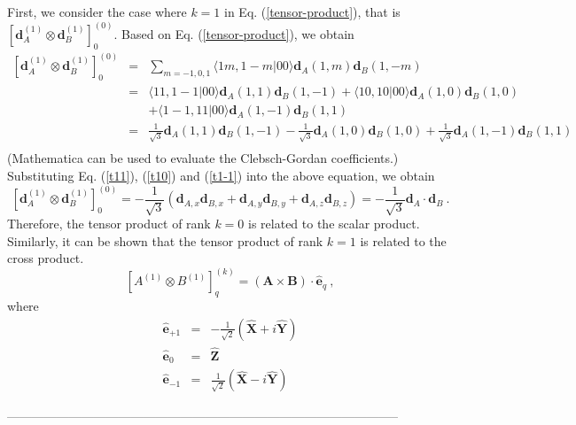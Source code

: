 First, we consider the case where $k=1$ in Eq. (\ref{tensor-product}), that is $\left[ \mathbf{d}_{A}^{(1)} \otimes \mathbf{d}_{B}^{(1)} \right]_{0}^{(0)}$. Based on Eq. (\ref{tensor-product}), we obtain
\begin{eqnarray}
\left[ \mathbf{d}_{A}^{(1)} \otimes \mathbf{d}_{B}^{(1)} \right]_{0}^{(0)} & = & \sum_{m=-1,0,1} \langle 1 m, 1 -m | 00\rangle \mathbf{d}_{A}(1, m) \mathbf{d}_{B}(1, -m) \nonumber \\
&=& \langle 1 1, 1 -1 | 00\rangle \mathbf{d}_{A}(1, 1) \mathbf{d}_{B}(1, -1) + \langle 1 0, 1 0 | 00\rangle \mathbf{d}_{A}(1, 0) \mathbf{d}_{B}(1, 0) \nonumber \\
&  & + \langle 1 -1, 1 1 | 00\rangle \mathbf{d}_{A}(1, -1) \mathbf{d}_{B}(1, 1) \nonumber \\
&=&\frac{1}{\sqrt{3}} \mathbf{d}_{A}(1, 1) \mathbf{d}_{B}(1, -1) - \frac{1}{\sqrt{3}}\mathbf{d}_{A}(1, 0) \mathbf{d}_{B}(1, 0) +  \frac{1}{\sqrt{3}} \mathbf{d}_{A}(1, -1) \mathbf{d}_{B}(1, 1) \nonumber \\
\end{eqnarray}
(Mathematica can be used to evaluate the Clebsch-Gordan coefficients.)
Substituting Eq. (\ref{t11}), (\ref{t10}) and (\ref{t1-1}) into the above equation, we obtain
\begin{equation}
\left[ \mathbf{d}_{A}^{(1)} \otimes \mathbf{d}_{B}^{(1)} \right]_{0}^{(0)}  = -\frac{1}{\sqrt{3}} (\mathbf{d}_{A,x}\mathbf{d}_{B,x} + \mathbf{d}_{A,y}\mathbf{d}_{B,y} + \mathbf{d}_{A,z}\mathbf{d}_{B,z}) = -\frac{1}{\sqrt{3}} \mathbf{d}_{A}\cdot\mathbf{d}_{B} \ .
\end{equation}
Therefore, the tensor product of rank $k=0$ is related to the scalar product. Similarly, it can be shown that the tensor product of rank $k=1$ is related to the cross product. 
\begin{equation}
\left[ A^{(1)} \otimes B^{(1)} \right]_{q}^{(k)} = (\mathbf{A}\times \mathbf{B})\cdot \mathbf{\hat{e}}_{q} \ ,
\end{equation}
where
\begin{eqnarray}
\mathbf{\hat{e}}_{+1} &=& -\frac{1}{\sqrt{2}}(\mathbf{\hat{X}} + i \mathbf{\hat{Y}}) \nonumber \\
\mathbf{\hat{e}}_{0} &=& \mathbf{\hat{Z}} \nonumber \\
\mathbf{\hat{e}}_{-1} &=& \frac{1}{\sqrt{2}}(\mathbf{\hat{X}} - i \mathbf{\hat{Y}})
\end{eqnarray}


-----------------------------------------------------------------------------------------------

